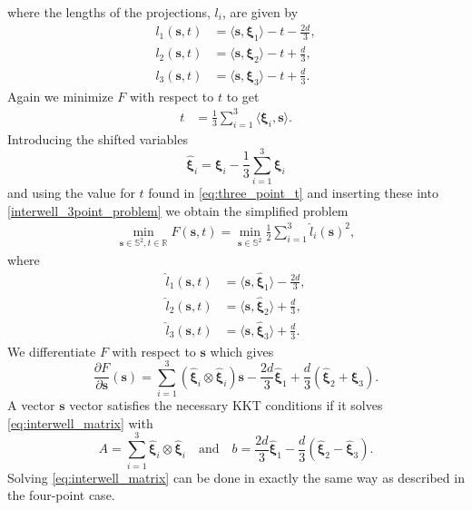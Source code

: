 where the lengths of the projections, $l_i$, are given by
%
\begin{align}
l_1(\textbf{s},t) &=  \langle \textbf{s}, \boldsymbol{\xi}_1 \rangle - t  - \frac{2d}{3}, \\
l_2(\textbf{s},t) &=  \langle \textbf{s}, \boldsymbol{\xi}_2 \rangle - t  + \frac{d}{3}, \\
l_3(\textbf{s},t) &=  \langle \textbf{s}, \boldsymbol{\xi}_3 \rangle - t  + \frac{d}{3}.
\label{eq:interwell_lengths_3p}
\end{align}
%
Again we minimize $F$ with respect to $t$ to get
\begin{align}
t &= \frac{1}{3} \sum_{i=1}^3 \langle \boldsymbol{\xi}_i,\textbf{s} \rangle.
\label{eq:three_point_t}
\end{align} 
Introducing the shifted variables
\begin{equation}
\hat{\boldsymbol{\xi}}_i = \boldsymbol{\xi}_i - \frac{1}{3} \sum_{i=1}^3 \boldsymbol{\xi}_i
\end{equation}
and using the value for $t$ found in \eqref{eq:three_point_t} and inserting these into
\eqref{interwell_3point_problem} we obtain the simplified problem
%
\begin{align}
\min_{ \textbf{s} \in \mathbb{S}^2, t \in \mathbb{R}} F(\textbf{s},t) = \min_{ \textbf{s} \in \mathbb{S}^2} \frac{1}{2} \sum_{i=1}^3 \hat{l}_i(\textbf{s})^2,
\label{interwell_3point_problem_shifted}
\end{align}
%
where 
%
\begin{align}
\hat{l}_1(\textbf{s},t) &=  \langle \textbf{s}, \hat{\boldsymbol{\xi}}_1 \rangle - \frac{2d}{3}, \\
\hat{l}_2(\textbf{s},t) &=  \langle \textbf{s}, \hat{\boldsymbol{\xi}}_2 \rangle + \frac{d}{3}, \\
\hat{l}_3(\textbf{s},t) &=  \langle \textbf{s}, \hat{\boldsymbol{\xi}}_3 \rangle + \frac{d}{3}.
\label{eq:interwell_lengths_3p_shifted}
\end{align}
%
We differentiate $F$ with respect to $\textbf{s}$ which gives
%
\begin{equation}
\frac{\partial F}{\partial \textbf{s}} (\textbf{s}) =  \sum_{i=1}^3 (\hat{\boldsymbol{\xi}}_i \otimes \hat{\boldsymbol{\xi}}_i)\textbf{s}
- \frac{2d}{3}\hat{\boldsymbol{\xi}}_1 + \frac{d}{3}(\hat{\boldsymbol{\xi}}_2 + \hat{\boldsymbol{\xi}}_3).
\end{equation}
%
A vector $\textbf{s}$ vector satisfies the necessary KKT conditions if it solves \eqref{eq:interwell_matrix} with
%
\begin{equation}
A = \sum_{i=1}^3 \hat{\boldsymbol{\xi}}_i \otimes \hat{\boldsymbol{\xi}}_i \quad \text{and} \quad 
b = \frac{2d}{3}\hat{\boldsymbol{\xi}}_1 - \frac{d}{3}(\hat{\boldsymbol{\xi}}_2 - \hat{\boldsymbol{\xi}}_3).
\label{eq:A_b_three_points}
\end{equation}
%
Solving \eqref{eq:interwell_matrix} can be done in exactly the same way
as described in the four-point case.
%
%
